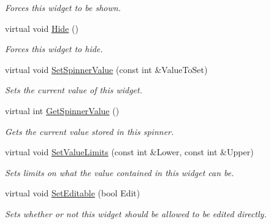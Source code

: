 \begin{DoxyCompactItemize}
\begin{DoxyCompactList}\small\item\em Forces this widget to be shown. \item\end{DoxyCompactList}\item 
\hypertarget{classphys_1_1UI_1_1Spinner_adcf8000c6d6eea51b52bac0d7f05bfd2}{
virtual void \hyperlink{classphys_1_1UI_1_1Spinner_adcf8000c6d6eea51b52bac0d7f05bfd2}{Hide} ()}
\label{classphys_1_1UI_1_1Spinner_adcf8000c6d6eea51b52bac0d7f05bfd2}

\begin{DoxyCompactList}\small\item\em Forces this widget to hide. \item\end{DoxyCompactList}\item 
virtual void \hyperlink{classphys_1_1UI_1_1Spinner_a7943087a7b61ec2ac7dcb7acab0e5345}{SetSpinnerValue} (const int \&ValueToSet)
\begin{DoxyCompactList}\small\item\em Sets the current value of this widget. \item\end{DoxyCompactList}\item 
virtual int \hyperlink{classphys_1_1UI_1_1Spinner_ae08a2762eb31aa28fcccf044973a2395}{GetSpinnerValue} ()
\begin{DoxyCompactList}\small\item\em Gets the current value stored in this spinner. \item\end{DoxyCompactList}\item 
virtual void \hyperlink{classphys_1_1UI_1_1Spinner_a933ec4a012ee5406b5ec576b0585a9c9}{SetValueLimits} (const int \&Lower, const int \&Upper)
\begin{DoxyCompactList}\small\item\em Sets limits on what the value contained in this widget can be. \item\end{DoxyCompactList}\item 
virtual void \hyperlink{classphys_1_1UI_1_1Spinner_abc02184e58175e363e2dfc1148ebd4d7}{SetEditable} (bool Edit)
\begin{DoxyCompactList}\small\item\em Sets whether or not this widget should be allowed to be edited directly. \item\end{DoxyCompactList}\item 

\end{DoxyCompactItemize}

